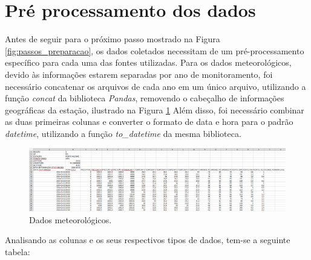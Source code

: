 \section{Pré processamento dos dados}

Antes de seguir para o próximo passo mostrado na Figura \ref{fig:passos_preparacao}, os dados coletados necessitam de um pré-processamento específico para cada uma das fontes utilizadas. Para os dados meteorológicos, devido às informações estarem separadas por ano de monitoramento, foi necessário concatenar os arquivos de cada ano em um único arquivo, utilizando a função \textit{concat} da biblioteca \textit{Pandas}, removendo o cabeçalho de informações geográficas da estação, ilustrado na Figura \ref{fig:base_inmet} Além disso, foi necessário combinar as duas primeiras colunas e converter o formato de data e hora para o padrão \textit{datetime}, utilizando a função \textit{to\_datetime} da mesma biblioteca. 

\begin{figure}[H]
	\caption{\label{fig:base_inmet}Dados meteorológicos.}
	\begin{center}
		\includegraphics[scale=0.25]{figuras/base_inmet.png}
	\end{center}
\end{figure}

Analisando as colunas e os seus respectivos tipos de dados, tem-se a seguinte tabela:

